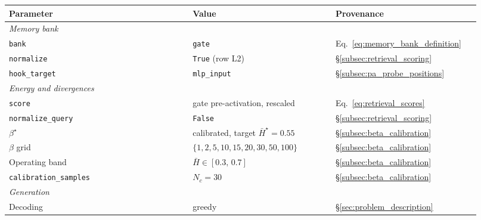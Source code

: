 \begin{table}[H]
    \centering
    \small
    \begin{tabular}{p{0.36\linewidth} p{0.28\linewidth} p{0.28\linewidth}}
        \toprule
        Parameter & Value & Provenance \\
        \midrule
        \multicolumn{3}{l}{\emph{Memory bank}} \\
        \hspace{1em}\texttt{bank}
            & \texttt{gate}
            & Eq.~\eqref{eq:memory_bank_definition} \\
        \hspace{1em}\texttt{normalize}
            & \texttt{True} (row L2)
            & \S\ref{subsec:retrieval_scoring} \\
        \hspace{1em}\texttt{hook\_target}
            & \texttt{mlp\_input}
            & \S\ref{subsec:pa_probe_positions} \\
        \multicolumn{3}{l}{\emph{Energy and divergences}} \\
        \hspace{1em}\texttt{score}
            & gate pre-activation, rescaled
            & Eq.~\eqref{eq:retrieval_scores} \\
        \hspace{1em}\texttt{normalize\_query}
            & \texttt{False}
            & \S\ref{subsec:retrieval_scoring} \\
        \hspace{1em}$\beta^\star$
            & calibrated, target $\bar{H}^\star{=}0.55$
            & \S\ref{subsec:beta_calibration} \\
        \hspace{1em}$\beta$ grid
            & $\{1,2,5,10,15,20,30,50,100\}$
            & \S\ref{subsec:beta_calibration} \\
        \hspace{1em}Operating band
            & $\bar{H} \in [0.3,\,0.7]$
            & \S\ref{subsec:beta_calibration} \\
        \hspace{1em}\texttt{calibration\_samples}
            & $N_c = 30$
            & \S\ref{subsec:beta_calibration} \\
        \multicolumn{3}{l}{\emph{Generation}} \\
        \hspace{1em}Decoding
            & greedy
            & \S\ref{sec:problem_description} \\

\end{tabular}
\end{table}
